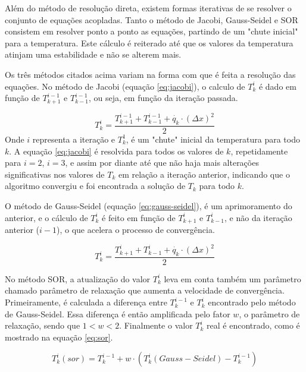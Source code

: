 Além do método de resolução direta, existem formas iterativas de se resolver o conjunto de equações acopladas. Tanto o método de Jacobi, Gauss-Seidel e SOR consistem em resolver ponto a ponto as equações, partindo de um "chute inicial" para a temperatura. Este cálculo é reiterado até que os valores da temperatura atinjam uma estabilidade e não se alterem mais. 

Os três métodos citados acima variam na forma com que é feita a resolução das equações. No método de Jacobi (equação \ref{eq:jacobi}), o calculo de $T_k^i$ é dado em função de  $T_{k+1}^{i-1}$ e $T_{k-1}^{i-1}$, ou seja, em função da iteração passada. 

\begin{equation}\label{eq:jacobi}
T_k^i = \frac{T_{k+1}^{i-1} + T_{k-1}^{i-1} + \dot{q_k} \cdot (\Delta x)^2}{2}
\end{equation}
Onde $i$ representa a iteração e $T_k^1$, é um "chute" inicial da temperatura para todo $k$. A equação \ref{eq:jacobi} é resolvida para todos os valores de $k$, repetidamente para $i=2$, $i=3$, e assim por diante até que não haja mais alterações significativas nos valores de $T_k$ em relação a iteração anterior, indicando que o algoritmo convergiu e foi encontrada a solução de $T_k$ para todo $k$.

O método de Gauss-Seidel (equação \ref{eq:gauss-seidel}), é um aprimoramento do anterior, e o cálculo de $T_{k}^i$ é feito em função de $T_{k+1}^i$ e $T_{k-1}^i$, e não da iteração anterior ($i-1$), o que acelera o processo de convergência. 

\begin{equation}\label{eq:gauss-seidel}
T_k^i = \frac{T_{k+1}^{i} + T_{k-1}^{i} + \dot{q_k} \cdot (\Delta x)^2}{2}
\end{equation}

No método SOR, a atualização do valor $T_k^i$ leva em conta também um parâmetro chamado parâmetro de relaxação que aumenta a velocidade de convergência. Primeiramente, é calculada a diferença entre $T_k^{i-1}$ e $T_k^i$ encontrado pelo método de Gauss-Seidel. Essa diferença é então amplificada pelo fator $w$, o parâmetro de relaxação, sendo que $ 1 < w < 2$. Finalmente o valor $T_k^i$ real é encontrado, como é mostrado na equação \ref{eq:sor}.

\begin{equation}\label{eq:sor}
T_k^i(sor) = T_k^{i-1} + w \cdot ( T_k^i(Gauss-Seidel) - T_k^{i-1} )
\end{equation}


